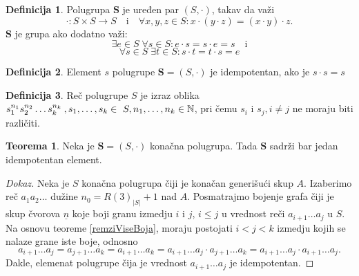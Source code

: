 \documentclass{article}
\theoremstyle{definition}
\newtheorem{definicija}{Definicija}[section]
\newtheorem{teorema}{Teorema}[section]
\newcommand{\dokaz}[1]{\begin{proof}[Dokaz]#1\end{proof}}
\begin{document}
	\begin{definicija}
		Polugrupa $\mathbf{S}$ je uređen par $(S,\cdot)$, takav da važi
		\[
		\cdot:S\times S \rightarrow S \quad\mathrm{i}\quad \forall x,y,z\in S: x\cdot (y\cdot z)=(x\cdot y)\cdot z.
		\]
		$\mathbf{S}$ je grupa ako dodatno važi:
		\[
		\exists e\in S\; \forall s \in S: e\cdot s=s\cdot e=s \quad \mathrm{i}
		\]
		\[
		\forall s\in S\; \exists t \in S: s\cdot t=t\cdot s=e
		\]
	\end{definicija}
	\begin{definicija}
		Element $s$ polugrupe $\mathbf{S}=(S,\cdot)$ je idempotentan, ako je $s\cdot s=s$ 
	\end{definicija}
	\begin{definicija}
		Reč polugrupe $S$ je izraz oblika $s_1^{n_1} s_2^{n_2} \ldots s_k^{n_k} \: ,s_1,\ldots,s_k \in ~S ,\\ n_1,\ldots,n_k \in \mathbb{N} $, pri čemu $s_i$ i $s_j, i\neq j$ ne moraju biti različiti.
	\end{definicija}
	\begin{teorema}
		Neka je $\mathbf{S}=(S,\cdot)$ konačna polugrupa. Tada $\mathbf{S}$ sadrži bar jedan idempotentan element.
	\end{teorema}
	\dokaz{
		Neka je $S$ konačna polugrupa čiji je konačan generišući skup $A$. Izaberimo reč $a_1 a_2\ldots$ dužine $n_0=R(3)_{|S|}+1$ nad $A$. Posmatrajmo bojenje  grafa čiji je skup čvorova $\underline{n}$ koje boji granu izmedju $i$ i $j$, $i\leq j$ u vrednost reči $a_{i+1} \ldots a_j$ u $S$. Na osnovu teoreme \ref{remziViseBoja}, moraju postojati $i<j<k$ izmedju kojih se nalaze grane iste boje, odnosno
		\[
		a_{i+1}\ldots a_j=a_{j+1}\ldots a_k=a_{i+1}\ldots a_k=	a_{i+1}\ldots a_j\cdot 	a_{j+1}\ldots a_k=a_{i+1}\ldots a_j\cdot 	a_{i+1}\ldots a_j.
		\]
		Dakle, elemenat polugrupe čija je vrednost $a_{i+1}\ldots a_j$ je idempotentan.
		
	}
	\newpage
	
\end{document}
